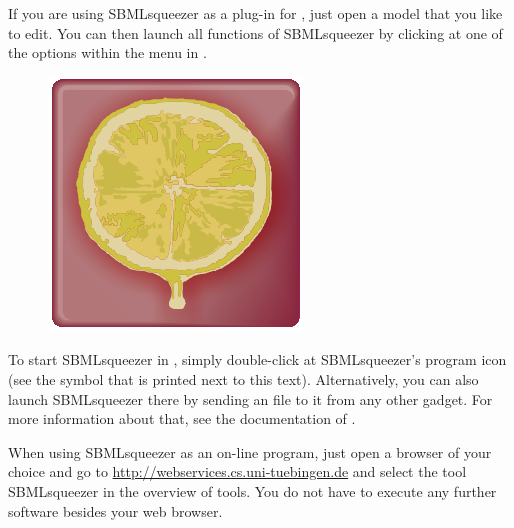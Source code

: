 If you are using SBMLsqueezer as a plug-in for \CellDesigner, just open a model that you like to edit.
You can then launch all functions of SBMLsqueezer by clicking at one of the options within the menu
 in \CellDesigner.

\begin{figure}
\vspace{\wrapfigspace}
\includegraphics[width=.8cm]{img/LOGO}
\end{figure}
To start SBMLsqueezer in \Garuda, simply double-click at SBMLsqueezer's program icon (see the symbol that is printed next to this text).
Alternatively, you can also launch SBMLsqueezer there by sending an \SBML file to it from any other \Garuda gadget.
For more information about that, see the documentation of \Garuda.

When using SBMLsqueezer as an on-line program, just open a browser of your choice and go to \url{http://webservices.cs.uni-tuebingen.de} and select the tool SBMLsqueezer in the overview of tools.
You do not have to execute any further software besides your web browser.


